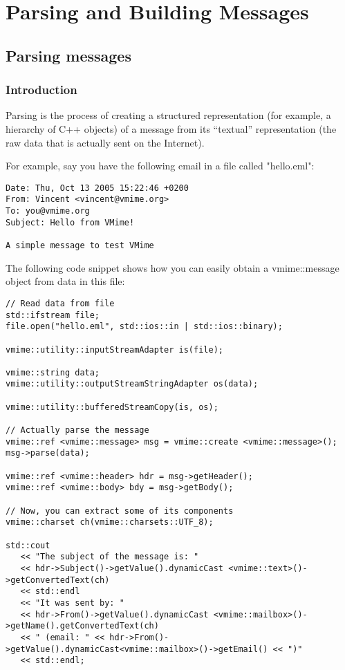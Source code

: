 \chapter{Parsing and Building Messages}

\section{Parsing messages}

\subsection{Introduction} %

Parsing is the process of creating a structured representation (for example,
a hierarchy of C++ objects) of a message from its ``textual'' representation
(the raw data that is actually sent on the Internet).

For example, say you have the following email in a file called "hello.eml":

\begin{verbatim}
Date: Thu, Oct 13 2005 15:22:46 +0200
From: Vincent <vincent@vmime.org>
To: you@vmime.org
Subject: Hello from VMime!

A simple message to test VMime
\end{verbatim}

The following code snippet shows how you can easily obtain a
{\vcode vmime::message} object from data in this file:

\begin{lstlisting}[caption={Parsing a message from a file}]
// Read data from file
std::ifstream file;
file.open("hello.eml", std::ios::in | std::ios::binary);

vmime::utility::inputStreamAdapter is(file);

vmime::string data;
vmime::utility::outputStreamStringAdapter os(data);

vmime::utility::bufferedStreamCopy(is, os);

// Actually parse the message
vmime::ref <vmime::message> msg = vmime::create <vmime::message>();
msg->parse(data);

vmime::ref <vmime::header> hdr = msg->getHeader();
vmime::ref <vmime::body> bdy = msg->getBody();

// Now, you can extract some of its components
vmime::charset ch(vmime::charsets::UTF_8);

std::cout
   << "The subject of the message is: "
   << hdr->Subject()->getValue().dynamicCast <vmime::text>()->getConvertedText(ch)
   << std::endl
   << "It was sent by: "
   << hdr->From()->getValue().dynamicCast <vmime::mailbox>()->getName().getConvertedText(ch)
   << " (email: " << hdr->From()->getValue().dynamicCast<vmime::mailbox>()->getEmail() << ")"
   << std::endl;
\end{lstlisting}

